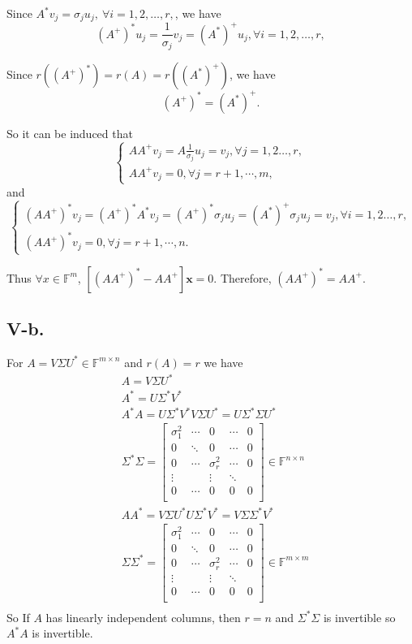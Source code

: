 \documentclass[a4paper]{article}
\begin{document}
Since $A^*v_j=\sigma_ju_j, \ \forall i=1,2,\ldots, r,$, we have
$$
(A^+)^*u_j=\frac{1}{\sigma_j}v_j=(A^*)^+u_j,\forall i=1,2,\ldots, r,
$$

Since $r((A^+)^*)=r(A)=r((A^*)^+)$, we have
$$
(A^+)^*=(A^*)^+.
$$

So it can be induced that
$$
\left\{\begin{array}{l}
  AA^+v_j=A\frac{1}{\sigma_j}u_j=v_j,\forall j=1,2\ldots, r,\\
  AA^+v_j=0,\forall j=r+1,\cdots,m,
\end{array}\right.
$$
and
$$
\left\{\begin{array}{l}
  (AA^+)^*v_j=(A^+)^*A^*v_j=(A^+)^*\sigma_ju_j=(A^*)^+\sigma_ju_j=v_j,\forall i=1,2\ldots, r,
  \\(AA^+)^*v_j=0,\forall j=r+1,\cdots,n.
\end{array}\right.
$$

Thus $\forall x\in \mathbb{F}^m$, $[(AA^+)^*-AA^+]\mathbf{x}=0$.
Therefore, $(AA^+)^* = AA^+$.





\subsection*{V-b.}
For $A=V\Sigma U^*\in \mathbb{F}^{m\times n}$ and $r(A)=r$ we have
$$
\begin{aligned}&A=V\Sigma U^*\\
  &A^*=U\Sigma^*V^*\\
  &A^*A=U\Sigma^*V^*V\Sigma U^*=U\Sigma^*\Sigma U^*\\
  &\Sigma^*\Sigma=\begin{bmatrix}
    \sigma_1^2 & \cdots & 0 & \cdots & 0\\
    0 & \ddots & 0 & \cdots & 0\\
    0 & \cdots & \sigma_r^2 & \cdots & 0\\
    \vdots &  & \vdots &\ddots\\
    0 & \cdots & 0 & 0 & 0\\
  \end{bmatrix}\in \mathbb{F}^{n\times n}\\
  &AA^*=V\Sigma U^*U\Sigma^* V^*=V\Sigma\Sigma^* V^*\\
  &\Sigma \Sigma^*=\begin{bmatrix}
    \sigma_1^2 & \cdots & 0 & \cdots & 0\\
    0 & \ddots & 0 & \cdots & 0\\
    0 & \cdots & \sigma_r^2 & \cdots & 0\\
    \vdots &  & \vdots &\ddots\\
    0 & \cdots & 0 & 0 & 0\\
  \end{bmatrix}\in \mathbb{F}^{m\times m}\\
\end{aligned}
$$
So If $A$ has linearly independent columns, then $r=n$ and $\Sigma^* \Sigma$ is invertible so $A^*A$ is invertible.
\end{document}

